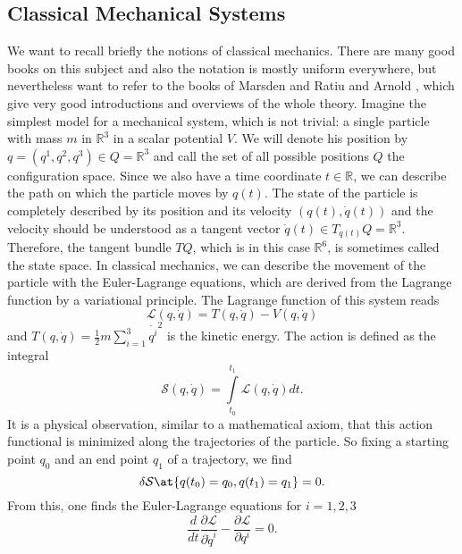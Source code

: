 \subsection{Classical Mechanical Systems}
\label{subsec:chap2_Classical}
We want to recall briefly the notions of classical mechanics. There are many 
good books on this subject and also the notation is mostly uniform everywhere, 
but nevertheless want to refer to the books of Marsden and Ratiu 
\cite{marsden.ratiu:1999a} and Arnold \cite{arnold:1989a}, which give very good 
introductions and overviews of the whole theory.
Imagine the simplest model for a mechanical system, which is not trivial: a 
single particle with mass $m$ in $\mathbb{R}^3$ in a scalar potential $V$. We 
will denote his position by $q = (q^1, q^2, q^3) \in Q = \mathbb{R}^3$ and call 
the set of all possible positions $Q$ the configuration space. Since we also 
have a time coordinate $t \in \mathbb{R}$, we can describe the path on which 
the particle moves by $q(t)$. The state of the particle is completely described 
by its position and its velocity $(q(t), \dot q(t))$ and the velocity should be 
understood as a tangent vector $\dot q(t) \in T_{q(t)}Q = \mathbb{R}^3$. 
Therefore, the tangent bundle $TQ$, which is in this case $\mathbb{R}^6$, is 
sometimes called the state space. In classical mechanics, we can describe the 
movement of the particle with the Euler-Lagrange equations, which are derived 
from the Lagrange function by a variational principle. The Lagrange function of 
this system reads
\begin{equation*}
	\mathcal{L}(q, \dot q)
	=
	T(q, \dot q) - V(q, \dot q)
\end{equation*}
and $T(q, \dot q) = \frac{1}{2} m  \sum_{i=1}^3 \dot{q^i}^2$ is the kinetic 
energy. The action 
is defined as the integral
\begin{equation*}
	\mathcal{S}(q, \dot q)
	=
	\int\limits_{t_0}^{t_1}
	\mathcal{L}(q, \dot q)
	dt.
\end{equation*}
It is a physical observation, similar to a mathematical axiom, that this action 
functional is minimized along the trajectories of the particle. So fixing a 
starting point $q_0$ and an end point $q_1$ of a trajectory, we find
\begin{equation*}
	\delta \mathcal{S}
	\at{q(t_0) = q_0, q(t_1) = q_1}
	=
	0.
\end{equation*}
From this, one finds the Euler-Lagrange equations for $i = 1, 2, 3$
\begin{equation*}
	\frac{d}{dt} 
	\frac{\partial \mathcal{L}}{\partial \dot q^i}
	-
	\frac{\partial \mathcal{L}}{\partial q^i}
	=
	0.
\end{equation*}
